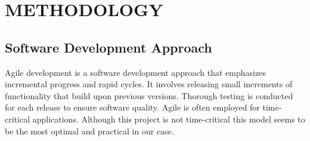 \chapter{METHODOLOGY}
\section{Software Development Approach}
Agile development is a software development approach that emphasizes incremental progress and rapid cycles. It involves releasing small increments of functionality that build upon previous versions. Thorough testing is conducted for each release to ensure software quality. Agile is often employed for time-critical applications. Although this project is not time-critical this model seems to be the most optimal and practical in our case.
\begin{figure}[hbt!]
\end{figure}
\newpage
